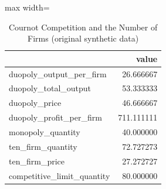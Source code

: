 \begin{table}[htbp]
\centering
\caption{Cournot Competition and the Number of Firms (original synthetic data)}
\begingroup
\small
\setlength{\tabcolsep}{6pt}
\renewcommand{\arraystretch}{1.12}
\begin{adjustbox}{max width=\linewidth}
\begin{tabular}{@{}lr@{}}
\toprule
 & value \\
\midrule
duopoly\_output\_per\_firm & 26.666667 \\
duopoly\_total\_output & 53.333333 \\
duopoly\_price & 46.666667 \\
duopoly\_profit\_per\_firm & 711.111111 \\
monopoly\_quantity & 40.000000 \\
ten\_firm\_quantity & 72.727273 \\
ten\_firm\_price & 27.272727 \\
competitive\_limit\_quantity & 80.000000 \\
\bottomrule
\end{tabular}
\end{adjustbox}
\endgroup
\end{table}